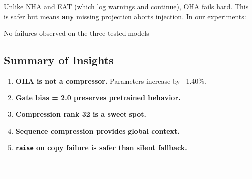 Unlike NHA and EAT (which log warnings and continue), OHA fails hard. This 
is safer but means \textbf{any} missing projection aborts injection. In our 
experiments:

No failures observed on the three tested models

\subsection{Summary of Insights}

\begin{enumerate}
\item \textbf{OHA is not a compressor.} Parameters increase by ~1.40\%.
\item \textbf{Gate bias = 2.0 preserves pretrained behavior.}
\item \textbf{Compression rank 32 is a sweet spot.}
\item \textbf{Sequence compression provides global context.}
\item \textbf{\texttt{raise} on copy failure is safer than silent fallback.}
\end{enumerate}
\begin{lstlisting}

---
\end{lstlisting}